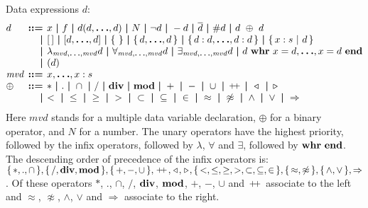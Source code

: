 \documentclass[a4paper,fleqn,10pt]{article}
\makeatletter
\newcommand{\f}[1]{\ensuremath{\mathit{#1}}}
\newenvironment{tightarray}[1]
  {\setlength{\arraycolsep}{2pt}%
   \begin{array}{@{}#1@{}}%
  }
  {\end{array}%
  }
\newcommand{\set}[1]{\ensuremath{\{\,#1\,\}}}
\newcommand{\scompr}[2]{\ensuremath{\set{#1\ |\ #2}}}
\newcommand{\el}{\ensuremath{[\,]}}
\newcommand{\cons}{\ensuremath{\hspace{0.12em}\triangleright\hspace{0.08em}}}
\newcommand{\snoc}{\ensuremath{\hspace{0.08em}\triangleleft\hspace{0.12em}}}
\newcommand{\concat}{\ensuremath{\hspace{0.12em}\raisebox{0.2ex}
{\text{\footnotesize+}\!\text{\footnotesize+}}\hspace{0.12em}}}
\newcommand{\limp}{\ensuremath{\Rightarrow}}
\newcommand{\mb}[1]{\text{\boldmath$#1$}}
\newcommand{\kwwhr}{{\bf whr}}
\newcommand{\kwend}{{\bf end}}
\newcommand{\kwdiv}{{\bf div}}
\newcommand{\kwmod}{{\bf mod}}
\makeatother
\begin{document}
Data expressions $d$:
\[\begin{tightarray}{lrl}
d      & \mb{::=} & x\ \mb{|}\ f\ \mb{|}\ d(d, \mb{\ldots}, d)\ \mb{|}\ N\ \mb{|}\
               \lnot d\ \mb{|}\ -d\ \mb{|}\ \overline{d}\ \mb{|}\ \#d\ \mb{|}\ d\ \oplus\ d\\
       & \mb{|} & \el\ \mb{|}\ [d,\mb{\ldots},d]\ \mb{|}\ \set{}\ \mb{|}\ \set{d,\mb{\ldots},d}\ \mb{|}\
               \set{d: d,\mb{\ldots},d: d}\ \mb{|}\ \scompr{x: s}{d}\\
       & \mb{|} & \lambda_{\f{mvd},\mb{\ldots},\f{mvd}} d\ \mb{|}\
               \forall_{\f{mvd},\mb{\ldots},\f{mvd}} d\ \mb{|}\ \exists_{\f{mvd},\mb{\ldots},\f{mvd}} d\ \mb{|}\
               d\ \kwwhr\ x=d,\mb{\ldots},x=d\ \kwend\\
        & \mb{|} & ( d )\\
\f{mvd}& \mb{::=} & x,\mb{\ldots},x: s\\
\oplus & \mb{::=} & *\ \mb{|}\ .\ \mb{|}\ \cap\ \mb{|}\
               /\ \mb{|}\  \kwdiv\ \mb{|}\ \kwmod\ \mb{|}\
               +\ \mb{|}\ -\ \mb{|}\ \cup\ \mb{|}\
               \concat\ \mb{|}\
               \snoc\ \mb{|}\
               \cons\\
       & \mb{|} &
               <\ \mb{|}\ \leq\ \mb{|}\ \geq\ \mb{|}\ >\ \mb{|}\ \subset\ \mb{|}\ \subseteq\ \mb{|}\ \in\ \mb{|}\
               \approx\ \mb{|}\ \not\approx\ \mb{|}\
               \land\ \mb{|}\ \lor\ \mb{|}\
               \limp
\end{tightarray}\]
Here $\f{mvd}$ stands for a multiple data variable declaration, $\oplus$ for a binary operator, and $N$ for a number.
The unary operators have the highest priority, followed by the infix operators,
followed by $\lambda$, $\forall$ and $\exists$, followed by $\kwwhr\ \kwend$.
The descending order of precedence of the infix operators is:
$\set{*, ., \cap}, \set{/, \kwdiv, \kwmod}, \set{+, -, \cup}, \concat, \snoc,
\cons, \set{<, \leq, \geq, >, \subset, \subseteq, \in}, \set{\approx,\not\approx},
\set{\land, \lor}, \limp$.
Of these operators $*$, $.$, $\cap$, $/$, $\kwdiv$, $\kwmod$, $+$, $-$, $\cup$ and
$\concat$ associate to the left and $\approx$, $\not\approx$, $\land$, $\lor$
and $\limp$ associate to the right.
\end{document}
